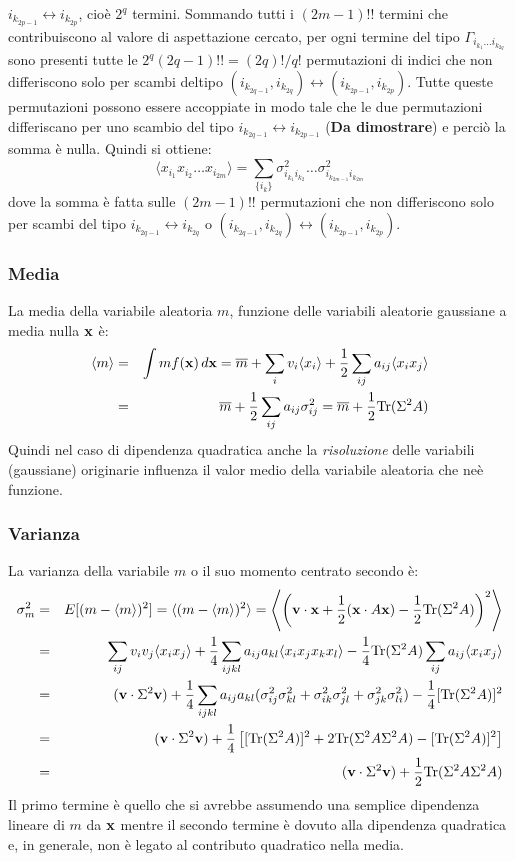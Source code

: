 $i_{k_{2p-1}}\leftrightarrow i_{k_{2p}}$, cio\`e $2^q$ termini. Sommando tutti i $(2m-1)!!$ termini che contribuiscono al valore di aspettazione cercato, per ogni termine del tipo $\Gamma_{i_{k_1}\ldots i_{k_{2q}}}$ sono presenti tutte le $2^q(2q-1)!!=(2q)!/q!$ permutazioni di indici che non differiscono solo per scambi deltipo $(i_{k_{2q-1}},i_{k_{2q}})\leftrightarrow(i_{k_{2p-1}},i_{k_{2p}})$. Tutte queste permutazioni
possono essere accoppiate in modo tale che le due permutazioni differiscano per uno
scambio del tipo $i_{k_{2q-1}}\leftrightarrow i_{k_{2p-1}}$ ({\bf Da dimostrare}) e perci\`o la somma \`e nulla. Quindi si ottiene:\[\langle x_{i_1}x_{i_2}\ldots x_{i_{2m}}\rangle=\sum_{\{i_k\}}\sigma^2_{i_{k_1} i_{k_2}}\ldots\sigma^2_{i_{k_{2m-1}} i_{k_{2m}}}\]dove la somma \`e fatta sulle $(2m-1)!!$ permutazioni che non differiscono solo
per scambi del tipo $i_{k_{2q-1}}\leftrightarrow i_{k_{2q}}$ o $(i_{k_{2q-1}},i_{k_{2q}})\leftrightarrow(i_{k_{2p-1}},i_{k_{2p}})$.
\subsubsection{Media}
La media della variabile aleatoria $m$, funzione delle variabili aleatorie gaussiane
a media nulla ${\bf x}$ \`e:
\begin{eqnarray}\label{mean}\langle m \rangle&=&\int m f({\bf x})\,d{\bf x}=\overline m+\sum_i v_i\langle x_i \rangle +\frac{1}{2}\sum_{ij}a_{ij}\langle x_i x_j\rangle\nonumber\\&=&\overline m+\frac{1}{2}\sum_{ij}a_{ij}\sigma^2_{ij}=\overline m+\frac{1}{2}{\rm Tr}(\Sigma^2 A)
\end{eqnarray}
Quindi nel caso di dipendenza quadratica anche la {\em risoluzione} delle variabili
(gaussiane) originarie influenza il valor medio della variabile aleatoria che ne\`e funzione.
%
\subsubsection{Varianza}
La varianza della variabile $m$ o il suo momento centrato secondo \`e:
\begin{eqnarray*}
\sigma^2_m&=&E[(m-\langle m \rangle)^2]=\langle( m-\langle m\rangle)^2\rangle=\left\langle\left({\bf v\cdot x}+\frac{1}{2}({\bf x}\cdot A{\bf x})-\frac{1}{2}{\rm Tr}(\Sigma^2 A)\right)^2\right\rangle\\
&=&\sum_{ij}v_iv_j\langle x_ix_j\rangle+\frac{1}{4}\sum_{ijkl}a_{ij}a_{kl}\langle x_i x_j x_k x_l\rangle- \frac{1}{4}{\rm Tr}(\Sigma^2 A)\sum_{ij}a_{ij}\langle x_i x_j\rangle\\
&=&({\bf v}\cdot\Sigma^2{\bf v})+\frac{1}{4}\sum_{ijkl}a_{ij}a_{kl}(\sigma^2_{ij}\sigma^2_{kl}+\sigma^2_{ik}\sigma^2_{jl}+\sigma^2_{jk}\sigma^2_{li})-\frac{1}{4}[{\rm Tr}(\Sigma^2 A)]^2\\
&=&({\bf v}\cdot\Sigma^2{\bf v})+\frac{1}{4}\left[[{\rm Tr}(\Sigma^2 A)]^2+2{\rm Tr}(\Sigma^2 A\Sigma^2 A)-[{\rm Tr}(\Sigma^2 A)]^2\right]\\
&=&({\bf v}\cdot\Sigma^2{\bf v})+\frac{1}{2}{\rm Tr}(\Sigma^2 A\Sigma^2 A)
\end{eqnarray*}
Il primo termine \`e quello che si avrebbe assumendo una semplice dipendenza lineare di $m$ da ${\bf x}$ mentre il secondo termine \`e dovuto alla dipendenza quadratica
e, in generale, non \`e legato al contributo quadratico nella media.
%
